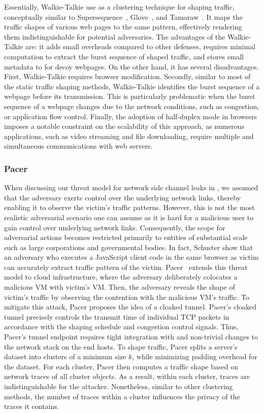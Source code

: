 Essentially, {Walkie-Talkie} use as a clustering technique for shaping traffic, conceptually similar to Supersequence~\cite{wang2014supersequence}, Glove~\cite{nithyanand2014glove}, and Tamaraw~\cite{cai2014systematic}.
It maps the traffic shapes of various web pages to the same pattern, effectively rendering them indistinguishable for potential adversaries.
The advantages of the {Walkie-Talkie} are: it adds small overheads compared to other defenses, requires minimal computation to extract the burst sequence of shaped traffic, and stores small metadata to for decoy webpages.
On the other hand, it has several disadvantages. 
First, {Walkie-Talkie} requires browser modification.  
Secondly, similar to most of the static traffic shaping methods, {Walkie-Talkie} identifies the burst sequence of a webpage before its transmission. 
This is particularly problematic when the burst sequence of a webpage changes due to the network conditions, such as congestion, or application flow control.  
Finally, the adoption of half-duplex mode in browsers imposes a notable constraint on the scalability of this approach, as numerous applications, such as video streaming and file downloading, require multiple and simultaneous communications with web servers.


\subsubsection{Pacer}
When discussing our threat model for network side channel leaks in , we assumed that the adversary exerts control over the underlying network links, thereby enabling it to observe the victim's traffic patterns.
However, this is not the most realistic adversarial scenario one can assume as it is hard for a malicious user to gain control over underlying network links.
Consequently, the scope for adversarial actions becomes restricted primarily to entities of substantial scale such as large corporations and governmental bodies.
In fact, Schuster show that an adversary who executes a JavaScript client code in the same browser as victim can accurately extract traffic pattern of the victim.
Pacer~\cite{mehta2022pacer} extends this threat model to cloud infrastructure, where the adversary deliberately colocates a malicious VM with victim's VM.
Then, the adversary reveals the shape of victim's traffic by observing the contention with the malicious VM's traffic.
To mitigate this attack, Pacer \cite{mehta2022pacer} proposes the idea of a cloaked tunnel.
Pacer's cloaked tunnel precisely controls the transmit time of individual
TCP packets in accordance with the shaping schedule and congestion control
signals.
Thus, Pacer's tunnel endpoint requires tight integration with and
non-trivial changes to the network stack on the end hosts.
To shape traffic, Pacer splits a server's dataset into clusters of a minimum size $k$, while minimizing padding overhead for the dataset.
For each cluster, Pacer then computes a traffic shape based on network traces of all cluster objects.
As a result, within each cluster, traces are indistinguishable for the attacker. 
Nonetheless, similar to other clustering methods, the number of traces within a cluster influences the privacy of the traces it contains.


